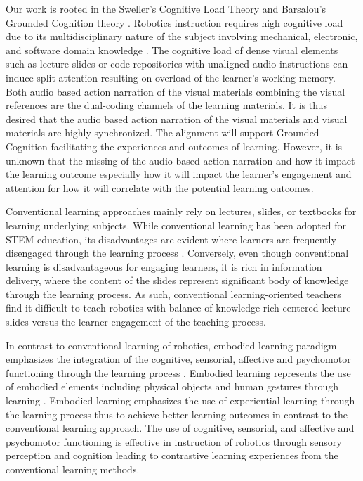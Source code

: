 Our work is rooted in the Sweller’s Cognitive Load Theory and Barsalou’s Grounded Cognition theory \cite{van2005cognitive}. Robotics instruction requires high cognitive load due to its multidisciplinary nature of the subject involving mechanical, electronic, and software domain knowledge \cite{kert2026innovative,paas2004cognitive}. The cognitive load of dense visual elements such as lecture slides or code repositories with unaligned audio instructions can induce split-attention resulting on overload of the learner's working memory. Both audio based action narration of the visual materials combining the visual references are the dual-coding channels of the learning materials. It is thus desired that the audio based action narration of the visual materials and visual materials are highly synchronized. The alignment will support Grounded Cognition facilitating the experiences and outcomes of learning. However, it is unknown that the missing of the audio based action narration and how it impact the learning outcome especially how it will impact the learner's engagement  and attention for how it will correlate with the potential learning outcomes. 


Conventional learning approaches mainly rely on lectures, slides, or textbooks for learning underlying subjects. While conventional learning has been adopted for STEM education, its disadvantages are evident where learners are frequently disengaged through the learning process \cite{freeman2014active}. Conversely, even though conventional learning is disadvantageous for engaging learners, it is rich in information delivery, where the content of the slides represent significant body of knowledge through the learning process. As such, conventional learning-oriented teachers find it difficult to teach robotics with balance of knowledge rich-centered lecture slides versus the learner engagement of the teaching process.     


In contrast to conventional learning of robotics, embodied learning paradigm emphasizes the integration of the cognitive, sensorial, affective and psychomotor functioning through the learning process \cite{jusslin2022embodied}. Embodied learning represents the use of embodied elements including  physical objects and human gestures through learning \cite{stolz2015embodied,macedonia2019embodied,munro2018principles}. Embodied learning emphasizes the use of experiential learning through the learning process thus to achieve better learning outcomes in contrast to the conventional learning approach. The use of cognitive, sensorial, and affective and psychomotor functioning is effective in instruction of robotics through sensory perception and cognition leading to contrastive learning experiences from the conventional learning methods.    




